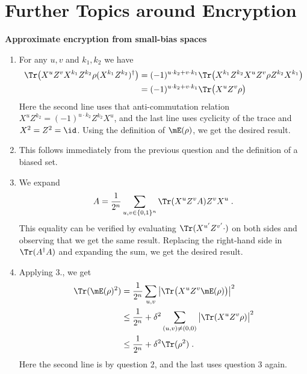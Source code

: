 
\newcommand{\Es}[1]{\ensuremath{\mathop{\textsc{E}}}_{#1}}

\chapter{Further Topics around Encryption}

\begin{exercises}


\item {\bf Approximate encryption from small-bias spaces}
\begin{enumerate}
\item For any $u,v$ and $k_1,k_2$ we have
\begin{align*}
\Tr\big(X^u Z^v X^{k_1} Z^{k_2} \rho (X^{k_1}Z^{k_2})^\dagger \big)
&= (-1)^{u\cdot k_2 + v\cdot k_1} \Tr\big(X^{k_1} Z^{k_2} X^u Z^v  \rho Z^{k_2} X^{k_1} \big)\\
&= (-1)^{u\cdot k_2 + v\cdot k_1} \Tr\big( X^u Z^v  \rho \big)
\end{align*}
Here the second line uses that anti-commutation relation $X^u Z^{k_2} = (-1)^{u\cdot k_2} Z^{k_2} X^u$, and the last line uses cyclicity of the trace and $X^2=Z^2=\id$. Using the definition of $\mE(\rho)$, we get the desired result. 
\item This follows immediately from the previous question and the definition of a biased set. 
\item We expand 
\[ A = \frac{1}{2^n}\sum_{u,v\in\{0,1\}^n} \Tr(X^uZ^v A) Z^v X^u\;.\]
This equality can be verified by evaluating $\Tr(X^{u'} Z^{v'} \cdot)$ on both sides and observing that we get the same result. Replacing the right-hand side in $\Tr(A^\dagger A)$ and expanding the sum, we get the desired result. 
\item Applying 3., we get
\begin{align*}
\Tr(\mE(\rho)^2) &= \frac{1}{2^n} \sum_{u,v} \big|\Tr\big(X^u Z^v \mE(\rho)\big)\big|^2\\
&\leq \frac{1}{2^n} + \delta^2 \sum_{(u,v)\neq (0,0)} \big|\Tr(X^u Z^v \rho)\big|^2\\
&\leq \frac{1}{2^n} + \delta^2 \Tr(\rho^2)\;.
\end{align*}
Here the second line is by question 2, and the last uses question 3 again. 


\end{enumerate}
\end{exercises}

